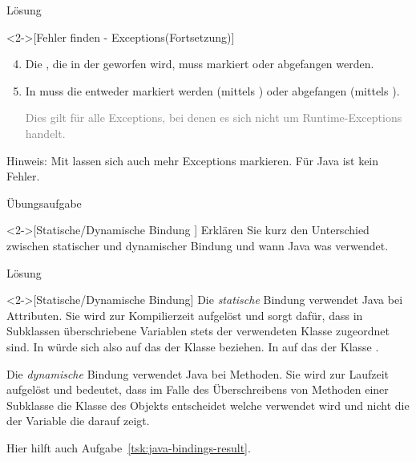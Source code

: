 \begin{frame}[c]{Lösung}
    \addtocounter{solve}{-1}
    \begin{solve}<2->[Fehler finden - Exceptions\hfill(Fortsetzung)]
        \begin{enumerate}[<+(1)->]
            \setcounter{enumi}{3}
            \item Die , die in der  geworfen wird, muss markiert oder abgefangen werden.
            \item In  muss die  entweder markiert werden (mittels ) oder abgefangen (mittels ).\pause\par \textcolor{gray}{Dies gilt für alle Exceptions, bei denen es sich nicht um Runtime-Exceptions handelt.}
        \end{enumerate}
        Hinweis: Mit  lassen sich auch mehr Exceptions markieren. Für Java ist  kein Fehler.
    \end{solve}
\end{frame}

\begin{frame}[c]{Übungsaufgabe}
    \begin{exercise}<2->[Statische/Dynamische Bindung ]
        Erklären Sie kurz den Unterschied zwischen statischer und dynamischer Bindung und wann Java was verwendet.
    \end{exercise}
\end{frame}

\begin{frame}[c]{Lösung}
    \begin{solve}<2->[Statische/Dynamische Bindung]
        Die \emph{statische} Bindung verwendet Java bei Attributen. Sie wird zur Kompilierzeit aufgelöst und sorgt dafür, dass in Subklassen überschriebene Variablen stets der verwendeten Klasse zugeordnet sind. In  würde sich  also auf das  der Klasse  beziehen. In  auf das der Klasse .\medskip\par
        \pause{}Die \emph{dynamische} Bindung verwendet Java bei Methoden. Sie wird zur Laufzeit aufgelöst und bedeutet, dass im Falle des Überschreibens von Methoden einer Subklasse die Klasse des Objekts entscheidet welche verwendet wird und nicht die der Variable die darauf zeigt.\pause\medskip\par
        Hier hilft auch Aufgabe~\ref{tsk:java-bindings-result}.
    \end{solve}
\end{frame}


